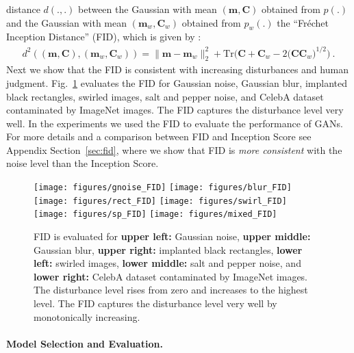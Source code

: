 \documentclass{article}
\newcommand\Bm{\bm{m}}
\newcommand\BC{\bm{C}}
\newcommand\TR{\mathbf{\mathrm{Tr}}}
\begin{document}
distance $d(.,.)$ between the Gaussian with mean $(\Bm,\BC)$ obtained
from $p(.)$ and the Gaussian with mean $(\Bm_w,\BC_w)$ obtained
from $p_w(.)$ the ``Fr\'{e}chet Inception Distance'' (FID), which is
given by \cite{Dowson:82}:
\begin{align}
d^2((\Bm,\BC),(\Bm_w,\BC_w))=\|\Bm-\Bm_w\|_2^2+  \TR \bigl(\BC+\BC_w-2\bigl(
\BC\BC_w\bigr)^{1/2}\bigr) \ .
\end{align}
Next we show that the FID is consistent with
increasing disturbances and human judgment.
Fig.~\ref{fig:FIDscore} evaluates the FID for Gaussian noise,
Gaussian blur, implanted black rectangles,
swirled images, salt and pepper noise, and
CelebA dataset contaminated by ImageNet images.
The FID captures the disturbance level very well.
In the experiments we used the FID to evaluate the performance of GANs.
For more details and a comparison between FID and Inception Score
see Appendix Section~\ref{sec:fid}, where we show that FID is \textit{more
consistent} with the noise level than the Inception Score.

\begin{figure} \texttt{[image: figures/gnoise\_FID]}
\texttt{[image: figures/blur\_FID]}
\texttt{[image: figures/rect\_FID]}
\texttt{[image: figures/swirl\_FID]}
\texttt{[image: figures/sp\_FID]}
\texttt{[image: figures/mixed\_FID]}
\caption[FID evaluated for different disturbances]{FID is evaluated for {\bf
upper left:} Gaussian noise, {\bf upper middle:} Gaussian blur, {\bf upper right:} implanted black rectangles, {\bf
lower left:} swirled images, {\bf lower middle:} salt and pepper
noise, and {\bf lower right:} CelebA dataset contaminated by
ImageNet images.
The disturbance level rises from zero and increases to the highest
level. The FID captures the disturbance level very well by
monotonically increasing.
  \label{fig:FIDscore} }
\end{figure}

\paragraph{Model Selection and Evaluation.}
\end{document}
